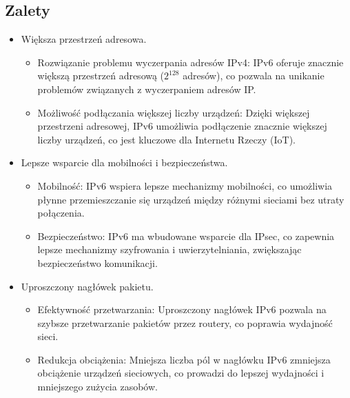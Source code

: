 \subsection{Zalety}
\begin{itemize}
    \item Większa przestrzeń adresowa.
    \begin{itemize}
        \item Rozwiązanie problemu wyczerpania adresów IPv4: IPv6 oferuje znacznie większą przestrzeń adresową ($2^{128}$ adresów), co pozwala na unikanie problemów związanych z wyczerpaniem adresów IP.
        \item Możliwość podłączania większej liczby urządzeń: Dzięki większej przestrzeni adresowej, IPv6 umożliwia podłączenie znacznie większej liczby urządzeń, co jest kluczowe dla Internetu Rzeczy (IoT).
    \end{itemize}
    \item Lepsze wsparcie dla mobilności i bezpieczeństwa.
    \begin{itemize}
        \item Mobilność: IPv6 wspiera lepsze mechanizmy mobilności, co umożliwia płynne przemieszczanie się urządzeń między różnymi sieciami bez utraty połączenia.
        \item Bezpieczeństwo: IPv6 ma wbudowane wsparcie dla IPsec, co zapewnia lepsze mechanizmy szyfrowania i uwierzytelniania, zwiększając bezpieczeństwo komunikacji.
    \end{itemize}
    \item Uproszczony nagłówek pakietu.
    \begin{itemize}
        \item Efektywność przetwarzania: Uproszczony nagłówek IPv6 pozwala na szybsze przetwarzanie pakietów przez routery, co poprawia wydajność sieci.
        \item Redukcja obciążenia: Mniejsza liczba pól w nagłówku IPv6 zmniejsza obciążenie urządzeń sieciowych, co prowadzi do lepszej wydajności i mniejszego zużycia zasobów.
    \end{itemize}
\end{itemize}

